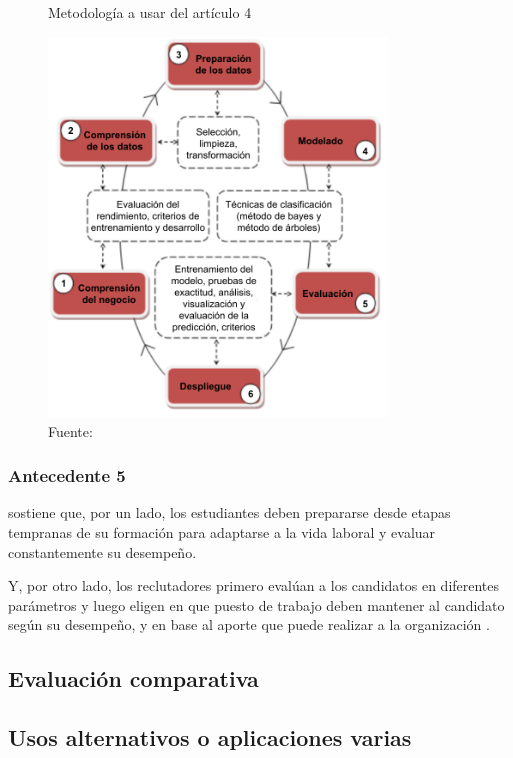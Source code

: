 \begin{figure}[H]
  \centering
  \caption{Metodología a usar del artículo 4}
  \includegraphics[width=0.8\textwidth]{E_IMAGENES/1_Capitulo2/1-research-background/Paper_4_1.pdf}
  \caption*{Fuente: \citet{arxiv2013}}
  \label{fig:Paper_4_1}
\end{figure}

\subsubsection{Antecedente 5}

\citet{IJET11738} sostiene que, por un lado, los estudiantes deben prepararse desde etapas tempranas de su formación para adaptarse a la vida laboral y evaluar constantemente su desempeño.

Y, por otro lado, los reclutadores primero evalúan a los candidatos en diferentes parámetros y luego eligen en que puesto de trabajo deben mantener al candidato según su desempeño, y en base al aporte que puede realizar a la organización \citep{IJET11738}.

\subsection{Evaluación comparativa}

\lipsum[6]

\subsection{Usos alternativos o aplicaciones varias}

